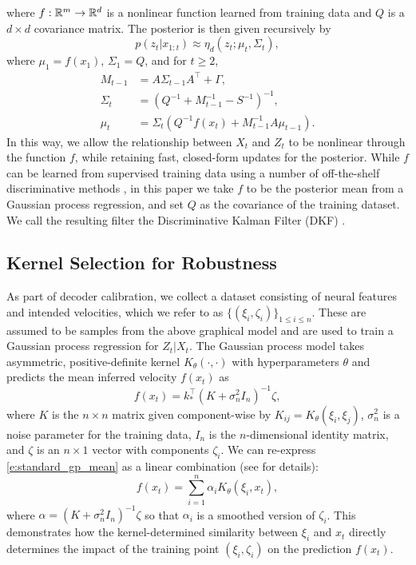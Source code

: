 where $f:\mathbb{R}^m \rightarrow \mathbb{R}^d$ is a nonlinear function learned from training data and $Q$ is a $d\!\times\!d $ covariance matrix.  The posterior is then given recursively by
\begin{equation}
\label{e:posterior}
p(z_t|x_{1:t}) \approx \eta_d(z_t; \mu_t, \Sigma_t), 
\end{equation}
where $\mu_1=f(x_1)$, $\Sigma_1=Q$, and for $t\ge 2$,
\begin{equation} 
\label{e:DKF} 
\begin{aligned}  
M_{t-1} &= A\Sigma_{t-1}A^\intercal+\Gamma , \\
\Sigma_t & = (Q^{-1}+M_{t-1}^{-1}-S^{-1})^{-1} ,  \\
\mu_t & = \Sigma_t(Q^{-1}f(x_t) + M_{t-1}^{-1}A\mu_{t-1}) .
\end{aligned} 
\end{equation}
In this way, we allow the relationship between $X_t$ and $Z_t$ to be nonlinear through the function $f$, while retaining fast, closed-form updates for the posterior.  While $f$ can be learned from supervised training data using a number of off-the-shelf discriminative methods \cite{Burkhart2016}, in this paper we take $f$ to be the posterior mean from a Gaussian process regression, and set $Q$ as the covariance of the training dataset. We call the resulting filter the Discriminative Kalman Filter (DKF) \cite{Burkhart2016}.

\subsection{Kernel Selection for Robustness} \label{s:kernel_selection}  

As part of decoder calibration, we collect a dataset consisting of neural features and intended velocities, which we refer to as $\{(\xi_i,\zeta_i)\}_{1\leq i \leq n}$.  These are assumed to be samples from the above graphical model and are used to train a Gaussian process regression for $Z_t|X_t$.  The Gaussian process model takes asymmetric, positive-definite kernel $K_\theta(\cdot,\cdot)$ with hyperparameters $\theta$ and predicts the mean inferred velocity $f(x_t)$ as
\begin{equation}
\label{e:standard_gp_mean}
f(x_t) = k_*^\intercal (K+\sigma_n^2I_n)^{-1} \zeta,
\end{equation}
where $K$ is the $n\!\times\! n$ matrix given component-wise by $K_{ij} = K_\theta(\xi_i,\xi_j)$, $\sigma_n^2$ is a noise parameter for the training data, $I_n$ is the $n$-dimensional identity matrix, and $\zeta$ is an $n\!\times\! 1$ vector with components $\zeta_i$.  We can re-express \eqref{e:standard_gp_mean} as 
a linear combination (see \cite{Ras06} for details):
\begin{equation}
\label{e:kernel_mean}
f(x_t) = \sum_{i=1}^n \alpha_i K_\theta(\xi_i, x_t),
\end{equation}
where $\alpha = (K+\sigma_n^2I_n)^{-1}\zeta$ so that $\alpha_i$ is a smoothed version of $\zeta_i$.  This demonstrates how the kernel-determined similarity between $\xi_i$ and $x_t$ directly determines the impact of the training point $(\xi_i,\zeta_i)$ on the prediction $f(x_t)$.


